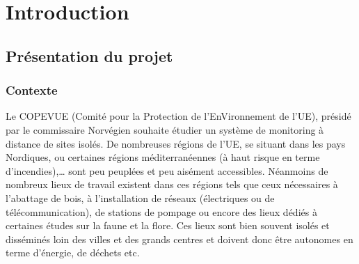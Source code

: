 
\section{Introduction}

    \subsection{Présentation du projet}

        \subsubsection{Contexte}
            Le COPEVUE (Comité pour la Protection de l’EnVironnement
            de l’UE), présidé par le commissaire Norvégien souhaite
            étudier un système de monitoring à distance de sites isolés.
            De nombreuses régions de l’UE, se situant dans les pays
            Nordiques, ou certaines régions méditerranéennes (à haut
            risque en terme d’incendies),… sont peu peuplées et peu
            aisément accessibles. Néanmoins de nombreux lieux de
            travail existent dans ces régions tels que ceux nécessaires
            à l’abattage de bois, à l’installation de réseaux
            (électriques ou de télécommunication), de stations de
            pompage ou encore des lieux dédiés à certaines études sur
            la faune et la flore. Ces lieux sont bien souvent isolés et
            disséminés loin des villes et des grands centres et doivent
            donc être autonomes en terme d’énergie, de déchets etc.

